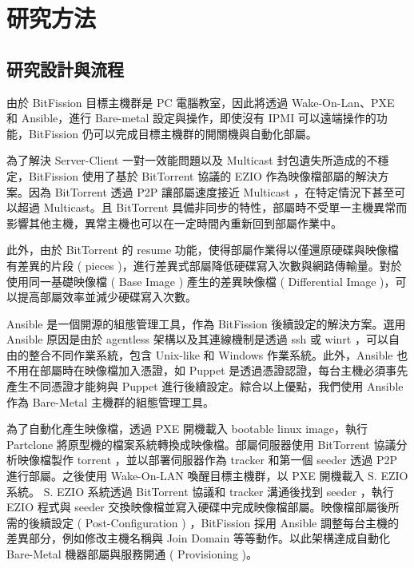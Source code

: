 \chapter{研究方法}
\section{研究設計與流程}
由於 BitFission 目標主機群是 PC 電腦教室，因此將透過 Wake-On-Lan、PXE 和 Ansible，進行 Bare-metal 設定與操作，即使沒有 IPMI 可以遠端操作的功能，BitFission 仍可以完成目標主機群的開關機與自動化部屬。


為了解決 Server-Client 一對一效能問題以及 Multicast 封包遺失所造成的不穩定，BitFission 使用了基於 BitTorrent 協議的 EZIO 作為映像檔部屬的解決方案。因為 BitTorrent 透過 P2P 讓部屬速度接近 Multicast ，在特定情況下甚至可以超過 Multicast。且 BitTorrent 具備非同步的特性，部屬時不受單一主機異常而影響其他主機，異常主機也可以在一定時間內重新回到部屬作業中。


此外，由於 BitTorrent 的 resume 功能，使得部屬作業得以僅還原硬碟與映像檔有差異的片段 ( pieces )，進行差異式部屬降低硬碟寫入次數與網路傳輸量。對於使用同一基礎映像檔 ( Base Image ) 產生的差異映像檔 ( Differential Image )，可以提高部屬效率並減少硬碟寫入次數。


Ansible 是一個開源的組態管理工具，作為 BitFission 後續設定的解決方案。選用 Ansible 原因是由於 agentless 架構以及其連線機制是透過 ssh 或 winrt ，可以自由的整合不同作業系統，包含 Unix-like 和 Windows 作業系統。此外，Ansible 也不用在部屬時在映像檔加入憑證，如 Puppet 是透過憑證認證，每台主機必須事先產生不同憑證才能夠與 Puppet 進行後續設定。綜合以上優點，我們使用 Ansible 作為 Bare-Metal 主機群的組態管理工具。


為了自動化產生映像檔，透過 PXE 開機載入 bootable linux image，執行 Partclone 將原型機的檔案系統轉換成映像檔。部屬伺服器使用 BitTorrent 協議分析映像檔製作 torrent ，並以部署伺服器作為 tracker 和第一個 seeder 透過 P2P 進行部屬。之後使用 Wake-On-LAN 喚醒目標主機群，以 PXE 開機載入 S. EZIO 系統。 S. EZIO 系統透過 BitTorrent 協議和 tracker 溝通後找到 seeder ，執行 EZIO 程式與 seeder 交換映像檔並寫入硬碟中完成映像檔部屬。映像檔部屬後所需的後續設定 ( Post-Configuration ) ，BitFission 採用 Ansible 調整每台主機的差異部分，例如修改主機名稱與 Join Domain 等等動作。以此架構達成自動化 Bare-Metal 機器部屬與服務開通 ( Provisioning )。

\begin{comment}
本研究吉祥物如圖~\ref{i:cat}。


樹範例如~\ref{i:tree}


長條圖範例如~\ref{i:barchart}



本研究分組如表~\ref{t:group}

\end{comment}





    






